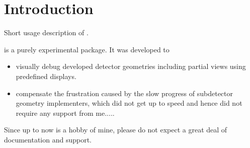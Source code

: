 \documentclass[10pt,a4paper]{article}
\begin{document}
\clearpage
%
%
\tableofcontents
\clearpage
%
%
\setcounter{page}{1}

\section{Introduction}
\label{sec:ddeve-user-manual-introduction}
\noindent
Short usage description of \DDE.

\noindent
\DDE is a purely experimental package. It was developed to 
\begin{itemize}
\item visually debug developed detector geometries including partial views 
       using predefined displays.
\item compensate the frustration caused by the slow progress of subdetector 
       geometry implementers, which did not get up to speed and hence did not
       require any support from me.....
\end{itemize}
Since up to now \DDE is a hobby of mine, please do not expect a great deal 
of documentation and support.

\end{document}
